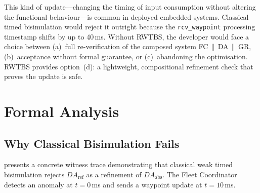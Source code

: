 \documentclass[11pt,a4paper]{article}
\newcommand{\DAabs}{\mathit{DA}_{\mathrm{abs}}}
\newcommand{\DAref}{\mathit{DA}_{\mathrm{ref}}}
\newcommand{\RWTBS}{RWTBS}
\begin{document}
This kind of update---changing the timing of input consumption without altering
the functional behaviour---is common in deployed embedded systems.  Classical
timed bisimulation would reject it outright because the \texttt{rcv\_waypoint}
processing timestamp shifts by up to 40\,ms.  Without \RWTBS{}, the developer
would face a choice between (a)~full re-verification of the composed system
FC\,$\|$\,DA\,$\|$\,GR, (b)~acceptance without formal guarantee, or
(c)~abandoning the optimisation.  \RWTBS{} provides option~(d): a lightweight,
compositional refinement check that proves the update is safe.

\section{Formal Analysis}
\label{sec:analysis}

\subsection{Why Classical Bisimulation Fails}
\label{sec:classical-fails}

 presents a concrete witness trace demonstrating that
classical weak timed bisimulation rejects $\DAref$ as a refinement of
$\DAabs$.  The Fleet Coordinator detects an anomaly at $t = 0$\,ms and sends a
waypoint update at $t = 10$\,ms.
\end{document}
